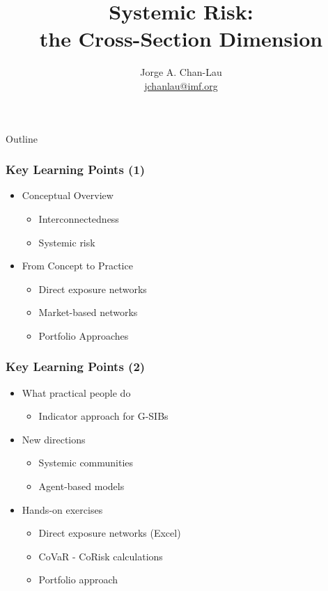 \documentclass[aspectratio=43,dvipsnames,usenames, svgnames]{beamer}
\title[Systemic Risk: Cross Section] %
{Systemic Risk:\\ the Cross-Section Dimension}
\author[Chan-Lau (IMF and NUS)] %
{\normalsize{Jorge A. Chan-Lau}\\
\scriptsize{\url{jchanlau@imf.org}}}
\institute[] %
{\footnotesize{
  Institute for Capacity and Development, International Monetary Fund \\
  Credit Research Initiative, National University of Singapore
  }}
\date[November 2017] %
{\footnotesize{Structured Curriculum Course\\
Macrofinancial Linkages, Systemic Risk, and Macroprudential policy}
\vspace{1em}

{\footnotesize{International Monetary Fund\\
November 6-8, 2017, Washington, D.C.\\}}

\vspace{1em}
\tiny{Do not reproduce or re-distribute without permission}
}
\begin{document}
\begin{frame} %
  \titlepage
\end{frame}
\begin{frame}{Outline} %
  \tableofcontents[hideallsubsections]
\end{frame}

\begin{frame} %
\frametitle{Key Learning Points (1)}
\begin{itemize}
	\item Conceptual Overview
		\begin{itemize}
			\item Interconnectedness
			\item Systemic risk
		\end{itemize}
	\smallskip
	\item From Concept to Practice
		\begin{itemize}
			\item Direct exposure networks
			\smallskip
			\item Market-based networks
			\smallskip
			\item Portfolio Approaches
		\end{itemize}
	\end{itemize}
\end{frame}

\begin{frame} %
\frametitle{Key Learning Points (2)}
\begin{itemize}
	\item What practical people do
		\begin{itemize}
			\item Indicator approach for G-SIBs
		\end{itemize}
	\smallskip
	\item New directions
		\begin{itemize}
			\item Systemic communities
			\item Agent-based models
		\end{itemize}
	\smallskip
	\item Hands-on exercises
		\begin{itemize}
			\item Direct exposure networks (Excel)
			\item CoVaR - CoRisk calculations
			\item Portfolio approach
		\end{itemize}
\end{itemize}
\end{frame}
\end{document}
